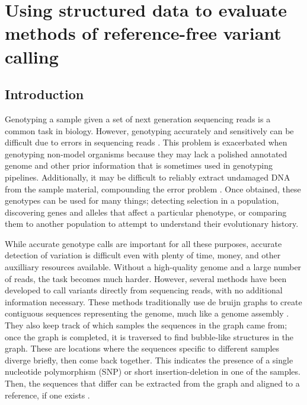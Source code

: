 \chapter{Using structured data to evaluate methods of reference-free variant calling}
\label{ch:structured}

\section{Introduction}

Genotyping a sample given a set of next generation sequencing reads is a common task in biology. However, genotyping accurately and sensitively can be difficult due to errors in sequencing reads \parencite{fox_accuracy_2014, pfeifer_next-generation_2017, wu_estimating_2017}. This problem is exacerbated when genotyping non-model organisms because they may lack a polished annotated genome and other prior information that is sometimes used in genotyping pipelines. Additionally, it may be difficult to reliably extract undamaged DNA from the sample material, compounding the error problem \parencite{da_fonseca_next-generation_2016}. Once obtained, these genotypes can be used for many things; detecting selection in a population, discovering genes and alleles that affect a particular phenotype, or comparing them to another population to attempt to understand their evolutionary history.

While accurate genotype calls are important for all these purposes, accurate detection of variation is difficult even with plenty of time, money, and other auxilliary resources available. Without a high-quality genome and a large number of reads, the task becomes much harder. However, several methods have been developed to call variants directly from sequencing reads, with no additional information necessary. These methods traditionally use de bruijn graphs to create contiguous sequences representing the genome, much like a genome assembly \parencite{leggett_reference-free_2014}. They also keep track of which samples the sequences in the graph came from; once the graph is completed, it is traversed to find bubble-like structures in the graph. These are locations where the sequences specific to different samples diverge briefly, then come back together. This indicates the presence of a single nucleotide polymorphism (SNP) or short insertion-deletion in one of the samples. Then, the sequences that differ can be extracted from the graph and aligned to a reference, if one exists \parencite{iqbal_novo_2012, uricaru_reference-free_2015}.

